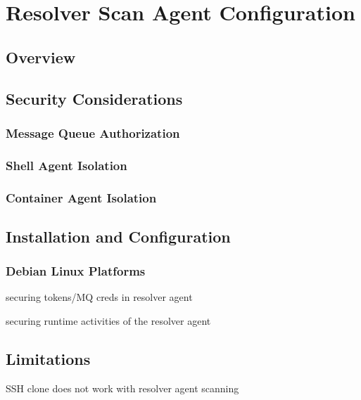 \section{Resolver Scan Agent Configuration}\label{sec:resolver-agent}

\subsection{Overview}


\subsection{Security Considerations}\label{sec:resolver-agent-security}

\subsubsection{Message Queue Authorization}

\subsubsection{Shell Agent Isolation}

\subsubsection{Container Agent Isolation}


\subsection{Installation and Configuration}

\subsubsection{Debian Linux Platforms}

securing tokens/MQ creds in resolver agent

securing runtime activities of the resolver agent


\subsection{Limitations}
SSH clone does not work with resolver agent scanning
